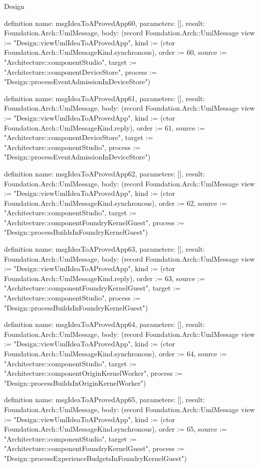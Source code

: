 \begin{lexlean}{Design}
\begin{semanticmodule}
definition{
  name: msgIdeaToAProvedApp60,
  parameters: [],
  result: Foundation.Arch::UmlMessage,
  body: (record Foundation.Arch::UmlMessage {view := "Design::viewUmlIdeaToAProvedApp", kind := (ctor Foundation.Arch::UmlMessageKind.synchronous), order := 60, source := "Architecture::componentStudio", target := "Architecture::componentDeviceStore", process := "Design::processEventAdmissionInDeviceStore"})
}

definition{
  name: msgIdeaToAProvedApp61,
  parameters: [],
  result: Foundation.Arch::UmlMessage,
  body: (record Foundation.Arch::UmlMessage {view := "Design::viewUmlIdeaToAProvedApp", kind := (ctor Foundation.Arch::UmlMessageKind.reply), order := 61, source := "Architecture::componentDeviceStore", target := "Architecture::componentStudio", process := "Design::processEventAdmissionInDeviceStore"})
}

definition{
  name: msgIdeaToAProvedApp62,
  parameters: [],
  result: Foundation.Arch::UmlMessage,
  body: (record Foundation.Arch::UmlMessage {view := "Design::viewUmlIdeaToAProvedApp", kind := (ctor Foundation.Arch::UmlMessageKind.synchronous), order := 62, source := "Architecture::componentStudio", target := "Architecture::componentFoundryKernelGuest", process := "Design::processBuildsInFoundryKernelGuest"})
}

definition{
  name: msgIdeaToAProvedApp63,
  parameters: [],
  result: Foundation.Arch::UmlMessage,
  body: (record Foundation.Arch::UmlMessage {view := "Design::viewUmlIdeaToAProvedApp", kind := (ctor Foundation.Arch::UmlMessageKind.reply), order := 63, source := "Architecture::componentFoundryKernelGuest", target := "Architecture::componentStudio", process := "Design::processBuildsInFoundryKernelGuest"})
}

definition{
  name: msgIdeaToAProvedApp64,
  parameters: [],
  result: Foundation.Arch::UmlMessage,
  body: (record Foundation.Arch::UmlMessage {view := "Design::viewUmlIdeaToAProvedApp", kind := (ctor Foundation.Arch::UmlMessageKind.synchronous), order := 64, source := "Architecture::componentStudio", target := "Architecture::componentOriginKernelWorker", process := "Design::processBuildsInOriginKernelWorker"})
}

definition{
  name: msgIdeaToAProvedApp65,
  parameters: [],
  result: Foundation.Arch::UmlMessage,
  body: (record Foundation.Arch::UmlMessage {view := "Design::viewUmlIdeaToAProvedApp", kind := (ctor Foundation.Arch::UmlMessageKind.synchronous), order := 65, source := "Architecture::componentStudio", target := "Architecture::componentFoundryKernelGuest", process := "Design::processExperienceBudgetsInFoundryKernelGuest"})
}


\end{semanticmodule}
\end{lexlean}
